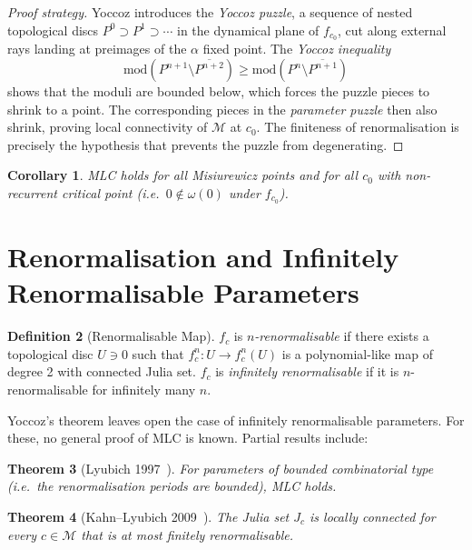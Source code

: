 \documentclass[12pt,a4paper]{amsart}
\newtheorem{theorem}{Theorem}[section]
\newtheorem{corollary}[theorem]{Corollary}
\theoremstyle{definition}
\newtheorem{definition}[theorem]{Definition}
\theoremstyle{remark}
\begin{document}
\begin{proof}[Proof strategy]
Yoccoz introduces the \emph{Yoccoz puzzle}, a sequence of nested
topological discs $P^0 \supset P^1 \supset \cdots$ in the dynamical plane
of $f_{c_0}$, cut along external rays landing at preimages of the $\alpha$
fixed point. The \emph{Yoccoz inequality}
\[
    \mathrm{mod}(P^{n+1} \setminus \overline{P^{n+2}}) \geq
    \mathrm{mod}(P^n \setminus \overline{P^{n+1}})
\]
shows that the moduli are bounded below, which forces the puzzle pieces
to shrink to a point. The corresponding pieces in the \emph{parameter puzzle}
then also shrink, proving local connectivity of $\mathcal{M}$ at $c_0$.
The finiteness of renormalisation is precisely the hypothesis that prevents
the puzzle from degenerating.
\end{proof}

\begin{corollary}
MLC holds for all Misiurewicz points and for all $c_0$ with non-recurrent
critical point (i.e.\ $0 \notin \omega(0)$ under $f_{c_0}$).
\end{corollary}

\section{Renormalisation and Infinitely Renormalisable Parameters}

\begin{definition}[Renormalisable Map]
$f_c$ is \emph{$n$-renormalisable} if there exists a topological disc
$U \ni 0$ such that $f_c^n \colon U \to f_c^n(U)$ is a polynomial-like
map of degree 2 with connected Julia set. $f_c$ is \emph{infinitely
renormalisable} if it is $n$-renormalisable for infinitely many $n$.
\end{definition}

Yoccoz's theorem leaves open the case of infinitely renormalisable
parameters. For these, no general proof of MLC is known. Partial results
include:

\begin{theorem}[Lyubich 1997~\cite{Lyubich1997}]
For parameters of \emph{bounded combinatorial type} (i.e.\ the renormalisation
periods are bounded), MLC holds.
\end{theorem}

\begin{theorem}[Kahn--Lyubich 2009~\cite{KahnLyubich2009}]
The Julia set $J_c$ is locally connected for every $c \in \mathcal{M}$
that is at most finitely renormalisable.
\end{theorem}
\end{document}
